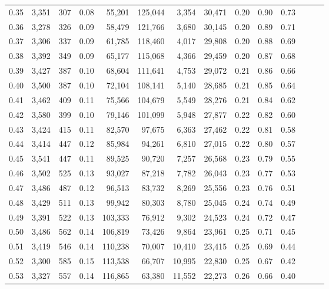 \begin{tabular}{rrrrrrrrrrrrrr}
0.35 &  3,351 &  307 &  0.08 &   55,201 &  125,044 &   3,354 &  30,471 &  0.20 &  0.90 &      0.73 \\
0.36 &  3,278 &  326 &  0.09 &   58,479 &  121,766 &   3,680 &  30,145 &  0.20 &  0.89 &      0.71 \\
0.37 &  3,306 &  337 &  0.09 &   61,785 &  118,460 &   4,017 &  29,808 &  0.20 &  0.88 &      0.69 \\
0.38 &  3,392 &  349 &  0.09 &   65,177 &  115,068 &   4,366 &  29,459 &  0.20 &  0.87 &      0.68 \\
0.39 &  3,427 &  387 &  0.10 &   68,604 &  111,641 &   4,753 &  29,072 &  0.21 &  0.86 &      0.66 \\
0.40 &  3,500 &  387 &  0.10 &   72,104 &  108,141 &   5,140 &  28,685 &  0.21 &  0.85 &      0.64 \\
0.41 &  3,462 &  409 &  0.11 &   75,566 &  104,679 &   5,549 &  28,276 &  0.21 &  0.84 &      0.62 \\
0.42 &  3,580 &  399 &  0.10 &   79,146 &  101,099 &   5,948 &  27,877 &  0.22 &  0.82 &      0.60 \\
0.43 &  3,424 &  415 &  0.11 &   82,570 &   97,675 &   6,363 &  27,462 &  0.22 &  0.81 &      0.58 \\
0.44 &  3,414 &  447 &  0.12 &   85,984 &   94,261 &   6,810 &  27,015 &  0.22 &  0.80 &      0.57 \\
0.45 &  3,541 &  447 &  0.11 &   89,525 &   90,720 &   7,257 &  26,568 &  0.23 &  0.79 &      0.55 \\
0.46 &  3,502 &  525 &  0.13 &   93,027 &   87,218 &   7,782 &  26,043 &  0.23 &  0.77 &      0.53 \\
0.47 &  3,486 &  487 &  0.12 &   96,513 &   83,732 &   8,269 &  25,556 &  0.23 &  0.76 &      0.51 \\
0.48 &  3,429 &  511 &  0.13 &   99,942 &   80,303 &   8,780 &  25,045 &  0.24 &  0.74 &      0.49 \\
0.49 &  3,391 &  522 &  0.13 &  103,333 &   76,912 &   9,302 &  24,523 &  0.24 &  0.72 &      0.47 \\
0.50 &  3,486 &  562 &  0.14 &  106,819 &   73,426 &   9,864 &  23,961 &  0.25 &  0.71 &      0.45 \\
0.51 &  3,419 &  546 &  0.14 &  110,238 &   70,007 &  10,410 &  23,415 &  0.25 &  0.69 &      0.44 \\
0.52 &  3,300 &  585 &  0.15 &  113,538 &   66,707 &  10,995 &  22,830 &  0.25 &  0.67 &      0.42 \\
0.53 &  3,327 &  557 &  0.14 &  116,865 &   63,380 &  11,552 &  22,273 &  0.26 &  0.66 &      0.40 \\

\end{tabular}
